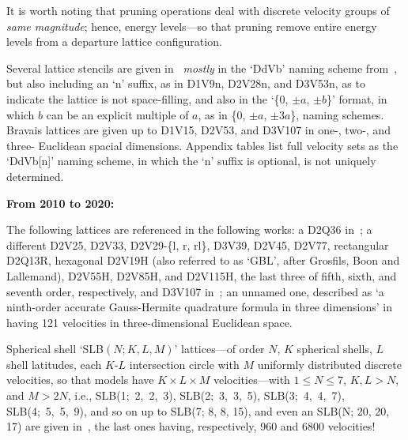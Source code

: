     It is worth noting that pruning operations deal with discrete velocity  groups  of  \emph{same  magnitude};  hence,  energy
    levels---so that pruning remove entire energy levels from a departure lattice configuration.

    Several lattice stencils are given in~\cite{2009-SurmasR+PhilippiPC-EurPhysJSpecialTopics} \emph{mostly} in the `DdVb' naming
    scheme from~\cite{2006-PhilippiPC+SurmasR-PhysRevE}, but also including an `n' suffix, as in D1V9n, D2V28n, and  D3V53n,  as
    to indicate the lattice is not space-filling, and also in the `\{$0$, $\pm a$, $\pm b$\}' format, in which  $b$  can  be  an
    explicit multiple of $a$, as in \{$0$, $\pm a$, $\pm 3a$\}, naming schemes. Bravais lattices are given up to  D1V15,  D2V53,
    and D3V107 in one-, two-, and three- Euclidean spacial dimensions. Appendix tables list full velocity sets as the  `DdVb[n]'
    naming scheme, in which the `n' suffix is optional, is not uniquely determined.


    \vspace{2.0mm}\noindent\textbf{From 2010 to 2020:}\vspace{1.0mm}

    The      following      lattices      are      referenced      in       the       following       works:       a       D2Q36
    in~\cite[p.~452]{2010-AidunCK+ClausenJR-AnnuRevFluidMech}; a different D2V25,  D2V33,  D2V29-\{l,  r,  rl\},  D3V39,  D2V45,
    D2V77, rectangular D2Q13R, hexagonal D2V19H (also referred to as `GBL', after Grosfils, Boon and Lallemand), D2V55H, D2V85H,
    and D2V115H, the last three of fifth, sixth, and seventh order, respectively, and D3V107 in~\cite{2010-HegeleLA-DrUFSC};  an
    unnamed  one,  described  as   `a   ninth-order   accurate   Gauss-Hermite   quadrature   formula   in   three   dimensions'
    in~\cite{2008-NieX+ChenH-PhysRevE} having 121 velocities in three-dimensional Euclidean space.

    Spherical shell `SLB$(N; K, L, M)$' lattices---of order $N$,  $K$  spherical  shells,  $L$  shell  latitudes,  each  $K$-$L$
    intersection circle with $M$ uniformly distributed  discrete  velocities,  so  that  models  have  $K  \times  L  \times  M$
    velocities---with $1 \leqslant N \leqslant  7$,  $K,  L  >  N$,  and  $M  >  2N$,  i.e.,  SLB(1;~2,~2,~3),  SLB(2;~3,~3,~5),
    SLB(3;~4,~4,~7), SLB(4;~5,~5,~9), and so  on  up  to  SLB(7;  8,  8,  15),  and  even  an  SLB(N;  20,  20,  17)  are  given
    in~\cite{2012-AmbrusVE+SofoneaV-PhysRevE}, the last ones having, respectively, 960 and 6800 velocities!

